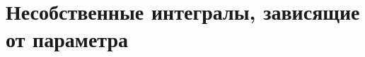 \documentclass[../main.tex]{subfiles}
\begin{document}
 \chapter{Несобственные интегралы, зависящие от параметра}
 
 
\end{document}
